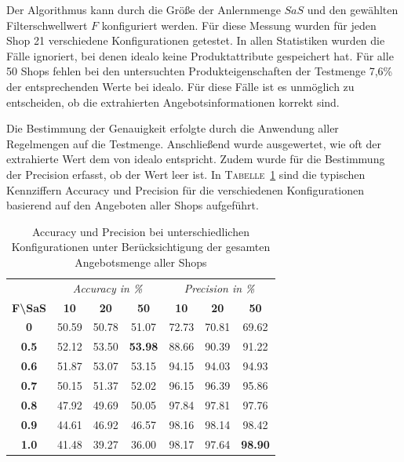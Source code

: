 Der Algorithmus kann durch die Größe der Anlernmenge $SaS$ und den gewählten Filterschwellwert $F$ konfiguriert werden.
Für diese Messung wurden für jeden Shop 21 verschiedene Konfigurationen getestet.
In allen Statistiken wurden die Fälle ignoriert, bei denen idealo keine Produktattribute gespeichert hat.
Für alle 50 Shops fehlen bei den untersuchten Produkteigenschaften der Testmenge 7,6\% der entsprechenden Werte
bei idealo.
Für diese Fälle ist es unmöglich zu entscheiden, ob die extrahierten Angebotsinformationen korrekt sind.

Die Bestimmung der Genauigkeit erfolgte durch die Anwendung aller Regelmengen auf die Testmenge.
Anschließend wurde ausgewertet, wie oft der extrahierte Wert dem von idealo entspricht.
Zudem wurde für die Bestimmung der Precision erfasst, ob der Wert leer ist.
In \textsc{Tabelle}~\ref{tab:accuracy-precision} sind die typischen Kennziffern Accuracy und Precision für die
verschiedenen Konfigurationen basierend auf den Angeboten aller Shops aufgeführt.

\begin{table}[h]
    \centering
    \begin{tabular}{ c | c c c | c c c }
        &   \multicolumn{3}{c}{\textit{Accuracy in \%}}    &   \multicolumn{3}{c}{\textit{Precision in \%}} \\
        \textbf{F\textbackslash SaS} & \textbf{10} & \textbf{20} & \textbf{50} & \textbf{10} & \textbf{20} & \textbf{50}  \\
        \hline
        \textbf{0}       &   50.59 &   50.78 &   51.07         &   72.73 &   70.81 &   69.62 \\
        \textbf{0.5}     &   52.12 &   53.50 &   \textbf{53.98}&   88.66 &   90.39 &   91.22 \\
        \textbf{0.6}     &   51.87 &   53.07 &   53.15         &   94.15 &   94.03 &   94.93 \\
        \textbf{0.7}     &   50.15 &   51.37 &   52.02         &   96.15 &   96.39 &   95.86 \\
        \textbf{0.8}     &   47.92 &   49.69 &   50.05         &   97.84 &   97.81 &   97.76 \\
        \textbf{0.9}     &   44.61 &   46.92 &   46.57         &   98.16 &   98.14 &   98.42 \\
        \textbf{1.0}     &   41.48 &   39.27 &   36.00         &   98.17 &   97.64 &   \textbf{98.90}

    \end{tabular}
    \caption{Accuracy und Precision bei unterschiedlichen Konfigurationen unter Berücksichtigung der gesamten
    Angebotsmenge aller Shops}
    \label{tab:accuracy-precision}
    \vspace{-0.25cm}
\end{table}

